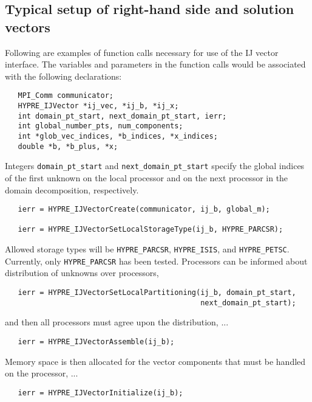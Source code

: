 \subsection{Typical setup of right-hand side and solution vectors}

Following are examples of function calls necessary for use of the
IJ vector interface.  The variables and parameters in the
function calls would be associated with the following declarations:

\begin{verbatim}
   MPI_Comm communicator;
   HYPRE_IJVector *ij_vec, *ij_b, *ij_x;
   int domain_pt_start, next_domain_pt_start, ierr;
   int global_number_pts, num_components;
   int *glob_vec_indices, *b_indices, *x_indices;
   double *b, *b_plus, *x;
\end{verbatim}

\noindent Integers \verb+domain_pt_start+ and \verb+next_domain_pt_start+
specify the global indices of the first unknown on the local processor
and on the next processor in the domain decomposition, respectively.

\begin{verbatim}
   ierr = HYPRE_IJVectorCreate(communicator, ij_b, global_m);

   ierr = HYPRE_IJVectorSetLocalStorageType(ij_b, HYPRE_PARCSR);
\end{verbatim}

\noindent Allowed storage types will be \verb+HYPRE_PARCSR+,
\verb+HYPRE_ISIS+, and \verb+HYPRE_PETSC+.  Currently, only
\verb+HYPRE_PARCSR+ has been tested.  Processors can be informed
about distribution of unknowns over processors,

\begin{verbatim}
   ierr = HYPRE_IJVectorSetLocalPartitioning(ij_b, domain_pt_start,
                                             next_domain_pt_start);
\end{verbatim}

\noindent and then all processors must agree upon the distribution, ...

\begin{verbatim}
   ierr = HYPRE_IJVectorAssemble(ij_b);
\end{verbatim}

\noindent Memory space is then allocated for the vector components
that must be handled on the processor, ...

\begin{verbatim}
   ierr = HYPRE_IJVectorInitialize(ij_b);          
\end{verbatim}

